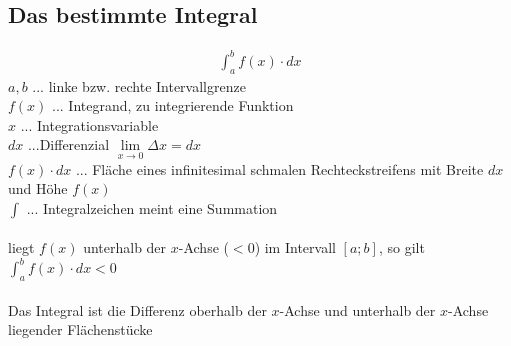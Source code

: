 \subsection{Das bestimmte Integral}
\begin{gather*}
  \int_a^b f(x) \cdot dx
\end{gather*}
$a, b$ ... linke bzw. rechte Intervallgrenze \\
$f(x)$ ... Integrand, zu integrierende Funktion \\
$x$ ... Integrationsvariable \\
$dx$ ...Differenzial \gap $\lim\limits_{x \to 0} \Delta x = dx$ \\
$f(x) \cdot dx$ ... Fläche eines infinitesimal schmalen Rechteckstreifens mit Breite $dx$ und Höhe $f(x)$ \\
$\int$ ... Integralzeichen meint eine Summation \\\\
liegt $f(x)$ unterhalb der $x$-Achse ($<0$) im Intervall $\left[a; b\right]$, so gilt $\int_a^b f(x) \cdot dx < 0$ \\\\
Das Integral ist die Differenz oberhalb der $x$-Achse und unterhalb der $x$-Achse liegender Flächenstücke
